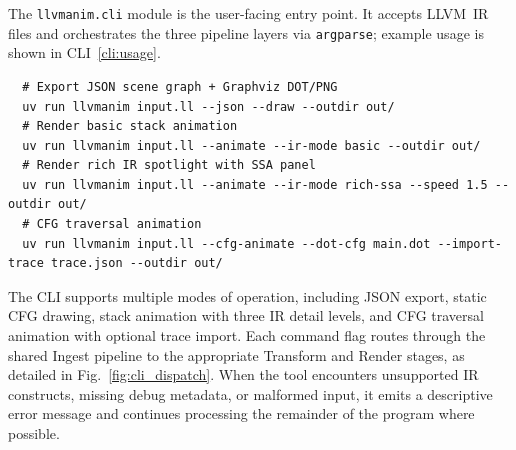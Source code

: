 The \texttt{llvmanim.cli} module is the user-facing entry point. It accepts LLVM~IR files and orchestrates the three pipeline layers via \texttt{argparse}; example usage is shown in CLI~\ref{cli:usage}.
\begin{verbatim}
  # Export JSON scene graph + Graphviz DOT/PNG
  uv run llvmanim input.ll --json --draw --outdir out/
  # Render basic stack animation
  uv run llvmanim input.ll --animate --ir-mode basic --outdir out/
  # Render rich IR spotlight with SSA panel
  uv run llvmanim input.ll --animate --ir-mode rich-ssa --speed 1.5 --outdir out/
  # CFG traversal animation
  uv run llvmanim input.ll --cfg-animate --dot-cfg main.dot --import-trace trace.json --outdir out/
\end{verbatim}
\vspace{-5ex}
\label{cli:usage}

\vspace{2ex}

The CLI supports multiple modes of operation, including JSON export, static CFG drawing, stack animation with three IR detail levels, and CFG traversal animation with optional trace import. Each command flag routes through the shared Ingest pipeline to the appropriate Transform and Render stages, as detailed in Fig.~\ref{fig:cli_dispatch}. When the tool encounters unsupported IR constructs, missing debug metadata, or malformed input, it emits a descriptive error message and continues processing the remainder of the program where possible.
